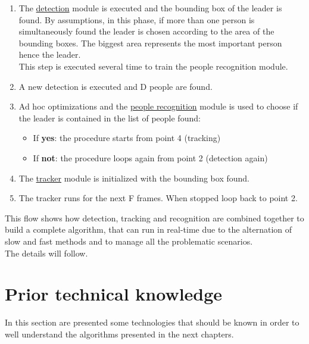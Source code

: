\begin{enumerate}
	\item The \underline{detection} module is executed and the bounding box of the leader is found. By assumptions, in this phase, if more than one person is simultaneously found the leader is chosen according to the area of the bounding boxes. The biggest area represents the most important person hence the leader.\\
	This step is executed several time to train the people recognition module.
	\item A new detection is executed and D people are found.
	\item Ad hoc optimizations and the \underline{people recognition} module is used to choose if the leader is contained in the list of people found:
	\begin{itemize}
		\item If \textbf{yes}: the procedure starts from point 4 (tracking)
		\item If \textbf{not}: the procedure loops again from point 2 (detection again)
	\end{itemize}
	\item The \underline{tracker} module is initialized with the bounding box found.
	\item The tracker runs for the next F frames. When stopped loop back to point 2.	
\end{enumerate}

This flow shows how detection, tracking and recognition are combined together to build a complete algorithm, that can run in real-time due to the alternation of slow and fast methods and to manage all the problematic scenarios.\\
The details will follow.


\section{Prior technical knowledge}
In this section are presented some technologies that should be known in order to well understand the algorithms presented in the next chapters.

